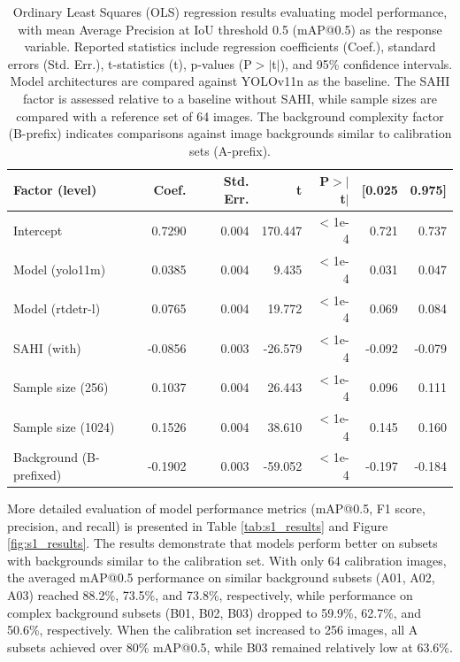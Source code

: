 \begin{table}[H]
    \centering
    \caption{Ordinary Least Squares (OLS) regression results evaluating model performance, with mean Average Precision at IoU threshold 0.5 (mAP@0.5) as the response variable. Reported statistics include regression coefficients (Coef.), standard errors (Std. Err.), t-statistics (t), p-values (P$>$$|$t$|$), and 95\% confidence intervals. Model architectures are compared against YOLOv11n as the baseline. The SAHI factor is assessed relative to a baseline without SAHI, while sample sizes are compared with a reference set of 64 images. The background complexity factor (B-prefix) indicates comparisons against image backgrounds similar to calibration sets (A-prefix).}
    \label{tab:ols_results}
    \small
    \begin{tabular}{lrrrrrr}
        \toprule
        \textbf{Factor (level)} & \textbf{Coef.} & \textbf{Std. Err.} & \textbf{t} & \textbf{P$>$$|$t$|$} & \textbf{[0.025} & \textbf{0.975]} \\
        \midrule
        Intercept & 0.7290 & 0.004 & 170.447 & < 1e-4 & 0.721 & 0.737 \\
        Model (yolo11m) & 0.0385 & 0.004 & 9.435 & < 1e-4 & 0.031 & 0.047 \\
        Model (rtdetr-l) & 0.0765 & 0.004 & 19.772 & < 1e-4 & 0.069 & 0.084 \\
        SAHI (with) & -0.0856 & 0.003 & -26.579 & < 1e-4 & -0.092 & -0.079 \\
        Sample size (256) & 0.1037 & 0.004 & 26.443 & < 1e-4 & 0.096 & 0.111 \\
        Sample size (1024) & 0.1526 & 0.004 & 38.610 & < 1e-4 & 0.145 & 0.160 \\
        Background (B-prefixed) & -0.1902 & 0.003 & -59.052 & < 1e-4 & -0.197 & -0.184 \\
        \bottomrule
    \end{tabular}
\end{table}

More detailed evaluation of model performance metrics (mAP@0.5, F1 score, precision, and recall) is presented in Table \ref{tab:s1_results} and Figure \ref{fig:s1_results}. The results demonstrate that models perform better on subsets with backgrounds similar to the calibration set. With only 64 calibration images, the averaged mAP@0.5 performance on similar background subsets (A01, A02, A03) reached 88.2\%, 73.5\%, and 73.8\%, respectively, while performance on complex background subsets (B01, B02, B03) dropped to 59.9\%, 62.7\%, and 50.6\%, respectively. When the calibration set increased to 256 images, all A subsets achieved over 80\% mAP@0.5, while B03 remained relatively low at 63.6\%.

